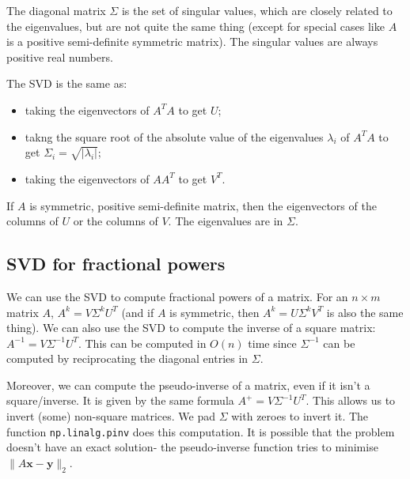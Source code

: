 \documentclass[a4paper, openany]{memoir}
\begin{document}
    The diagonal matrix $\Sigma$ is the set of singular values, which are closely related to the eigenvalues, but are not quite the same thing (except for special cases like $A$ is a positive semi-definite symmetric matrix). The singular values are always positive real numbers.

    The SVD is the same as:
    \begin{itemize}
        \item taking the eigenvectors of $A^T A$ to get $U$;
        \item takng the square root of the absolute value of the eigenvalues $\lambda_i$ of $A^T A$ to get $\Sigma_i = \sqrt{|\lambda_i|}$;
        \item taking the eigenvectors of $AA^T$ to get $V^T$.
    \end{itemize}
    If $A$ is symmetric, positive semi-definite matrix, then the eigenvectors of the columns of $U$ or the columns of $V$. The eigenvalues are in $\Sigma$.


    \subsection{SVD for fractional powers}
    We can use the SVD to compute fractional powers of a matrix. For an $n \times m$ matrix $A$, $A^k = V \Sigma^k U^T$ (and if $A$ is symmetric, then $A^k = U \Sigma^k V^T$ is also the same thing). We can also use the SVD to compute the inverse of a square matrix: $A^{-1} = V \Sigma^{-1} U^T$. This can be computed in $O(n)$ time since $\Sigma^{-1}$ can be computed by reciprocating the diagonal entries in $\Sigma$.

    Moreover, we can compute the pseudo-inverse of a matrix, even if it isn't a square/inverse. It is given by the same formula $A^{+} = V \Sigma^{-1} U^T$. This allows us to invert (some) non-square matrices. We pad $\Sigma$ with zeroes to invert it. The function \texttt{np.linalg.pinv} does this computation. It is possible that the problem doesn't have an exact solution- the pseudo-inverse function tries to minimise $\lVert A \mathbf{x} - \mathbf{y} \rVert_2$.
\end{document}
